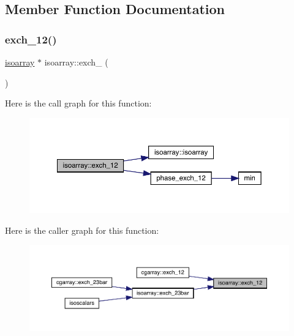 \subsection{Member Function Documentation}
\mbox{\label{classisoarray_acf019b3f53c42d35326ae81399cd556f}} 
\subsubsection{\texorpdfstring{exch\_12()}{exch\_12()}\hspace{0.1cm}{\footnotesize\ttfamily [1/2]}}
{\footnotesize\ttfamily \mbox{\hyperlink{classisoarray}{isoarray}} $\ast$ isoarray\+::exch\+\_ (\begin{DoxyParamCaption}{ }\end{DoxyParamCaption})}

Here is the call graph for this function\+:\nopagebreak
\begin{figure}[H]
\begin{center}
\leavevmode
\includegraphics[width=350pt]{d5/dd9/classisoarray_acf019b3f53c42d35326ae81399cd556f_cgraph}
\end{center}
\end{figure}
Here is the caller graph for this function\+:\nopagebreak
\begin{figure}[H]
\begin{center}
\leavevmode
\includegraphics[width=350pt]{d5/dd9/classisoarray_acf019b3f53c42d35326ae81399cd556f_icgraph}
\end{center}
\end{figure}
\mbox{\label{classisoarray_ac56742183c8846ff2a5b315d1fc0b90b}} 
